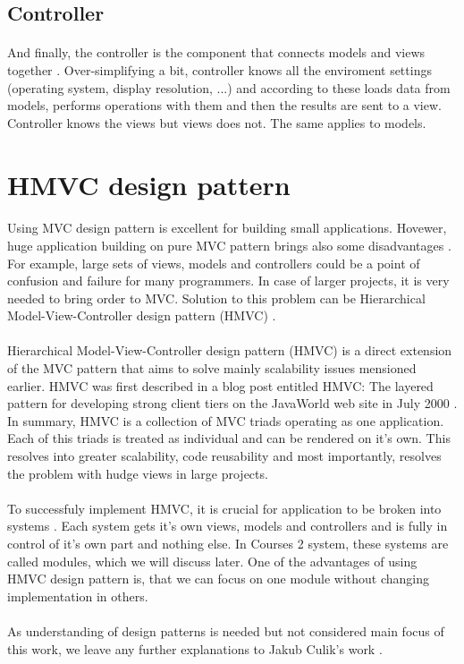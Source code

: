 \subsection{Controller}
\paragraph{}
And finally, the controller is the component that connects models and views together \cite{phpmvc}. Over-simplifying a bit, controller knows all the enviroment settings (operating system, display resolution, ...) and according to these loads data from models, performs operations with them and then the results are sent to a view. Controller knows the views but views does not. The same applies to models.

\section{HMVC design pattern}
\paragraph{}
Using MVC design pattern is excellent for building small applications. Hovewer, huge application building on pure MVC pattern brings also some disadvantages \cite{culik}. For example, large sets of views, models and controllers could be a point of confusion and failure for many programmers. In case of larger projects, it is very needed to bring order to MVC. Solution to this problem can be Hierarchical Model-View-Controller design pattern (HMVC) \cite{hmvc}.

\paragraph{}
Hierarchical Model-View-Controller design pattern (HMVC) is a direct extension of the MVC pattern that aims to solve mainly scalability issues mensioned earlier. HMVC was first described in a blog post entitled HMVC: The layered pattern for developing strong client tiers on the JavaWorld web site in July 2000 \cite{hmvc}. In summary, HMVC is a collection of MVC triads operating as one application. Each of this triads is treated as individual and can be rendered on it's own. This resolves into greater scalability, code reusability and most importantly, resolves the problem with hudge views in large projects.

\paragraph{}
To successfuly implement HMVC, it is crucial for application to be broken into systems \cite{hmvc}. Each system gets it's own views, models and controllers and is fully in control of it's own part and nothing else. In Courses 2 system, these systems are called modules, which we will discuss later. One of the advantages of using HMVC design pattern is, that we can focus on one module without changing implementation in others.

\paragraph{}
As understanding of design patterns is needed but not considered main focus of this work, we leave any further explanations to Jakub Culik's work \cite{culik}.